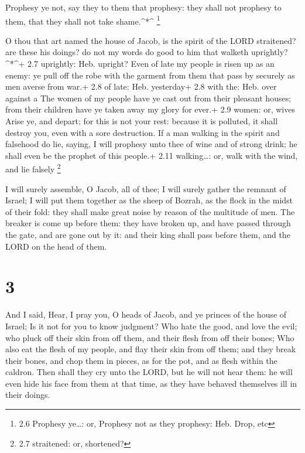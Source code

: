  Prophesy ye not, say they to them that prophesy: they shall
not prophesy to them, that they shall not take shame.\^{}*\^{}
\footnote{2.6 Prophesy ye\ldots: or, Prophesy not as they prophesy: Heb.
  Drop, etc}

 O thou that art named the house of Jacob, is the spirit of
the LORD straitened? are these his doings? do not my words do good to
him that walketh uprightly?\^{}*\^{}+ 2.7 uprightly: Heb. upright?
 Even of late my people is risen up as an enemy: ye pull off
the robe with the garment from them that pass by securely as men averse
from war.+ 2.8 of late: Heb. yesterday+ 2.8 with the: Heb. over against
a  The women of my people have ye cast out from their
pleasant houses; from their children have ye taken away my glory for
ever.+ 2.9 women: or, wives  Arise ye, and depart; for this
is not your rest: because it is polluted, it shall destroy you, even
with a sore destruction.  If a man walking in the spirit
and falsehood do lie, saying, I will prophesy unto thee of wine and of
strong drink; he shall even be the prophet of this people.+ 2.11
walking\ldots: or, walk with the wind, and lie falsely \footnote{2.7
  straitened: or, shortened?}

 I will surely assemble, O Jacob, all of thee; I will
surely gather the remnant of Israel; I will put them together as the
sheep of Bozrah, as the flock in the midst of their fold: they shall
make great noise by reason of the multitude of men.  The
breaker is come up before them: they have broken up, and have passed
through the gate, and are gone out by it: and their king shall pass
before them, and the LORD on the head of them.

\hypertarget{section-2}{%
\section{3}\label{section-2}}

 And I said, Hear, I pray you, O heads of Jacob, and ye
princes of the house of Israel; Is it not for you to know judgment?
 Who hate the good, and love the evil; who pluck off their
skin from off them, and their flesh from off their bones; 
Who also eat the flesh of my people, and flay their skin from off them;
and they break their bones, and chop them in pieces, as for the pot, and
as flesh within the caldron.  Then shall they cry unto the
LORD, but he will not hear them: he will even hide his face from them at
that time, as they have behaved themselves ill in their doings.

